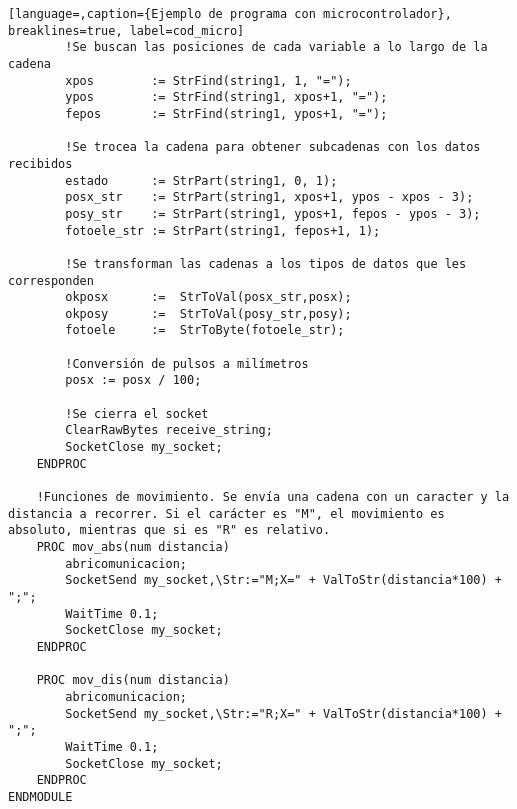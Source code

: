 \begin{lstlisting}[language=,caption={Ejemplo de programa con microcontrolador}, breaklines=true, label=cod_micro]
        !Se buscan las posiciones de cada variable a lo largo de la cadena
        xpos        := StrFind(string1, 1, "=");
        ypos        := StrFind(string1, xpos+1, "=");
        fepos       := StrFind(string1, ypos+1, "=");
        
        !Se trocea la cadena para obtener subcadenas con los datos recibidos
        estado      := StrPart(string1, 0, 1);
        posx_str    := StrPart(string1, xpos+1, ypos - xpos - 3);
        posy_str    := StrPart(string1, ypos+1, fepos - ypos - 3);
        fotoele_str := StrPart(string1, fepos+1, 1);

        !Se transforman las cadenas a los tipos de datos que les corresponden
        okposx      :=  StrToVal(posx_str,posx);
        okposy      :=  StrToVal(posy_str,posy);
        fotoele     :=  StrToByte(fotoele_str);
        
        !Conversión de pulsos a milímetros
        posx := posx / 100;

        !Se cierra el socket
        ClearRawBytes receive_string;
        SocketClose my_socket;
    ENDPROC

    !Funciones de movimiento. Se envía una cadena con un caracter y la distancia a recorrer. Si el carácter es "M", el movimiento es absoluto, mientras que si es "R" es relativo.
    PROC mov_abs(num distancia)
        abricomunicacion;
        SocketSend my_socket,\Str:="M;X=" + ValToStr(distancia*100) + ";";
        WaitTime 0.1;
        SocketClose my_socket;
    ENDPROC
    
    PROC mov_dis(num distancia)
        abricomunicacion;
        SocketSend my_socket,\Str:="R;X=" + ValToStr(distancia*100) + ";";
        WaitTime 0.1;
        SocketClose my_socket;
    ENDPROC
ENDMODULE
\end{lstlisting}
    
